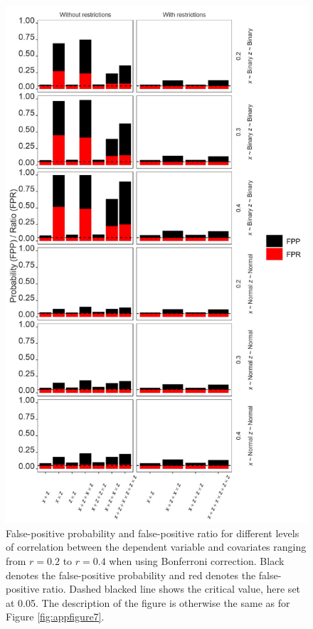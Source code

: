 \begin{landscape}
\begin{figure}[ht!]
\includegraphics[scale=0.16]{R/Analysis/Result/Figures/Figure2SIBon.jpeg}
\centering
\caption{False-positive probability and false-positive ratio for different levels of correlation between the dependent variable and covariates ranging from  $\textit{r}=0.2$ to  $\textit{r}=0.4$ when using Bonferroni correction. Black denotes the false-positive probability and red denotes the false-positive ratio. Dashed blacked line shows the critical value, here set at 0.05. The description of the figure is otherwise the same as for Figure \ref{fig:appfigure7}.}
\label{fig:appfigure8}
\end{figure}
\end{landscape}



